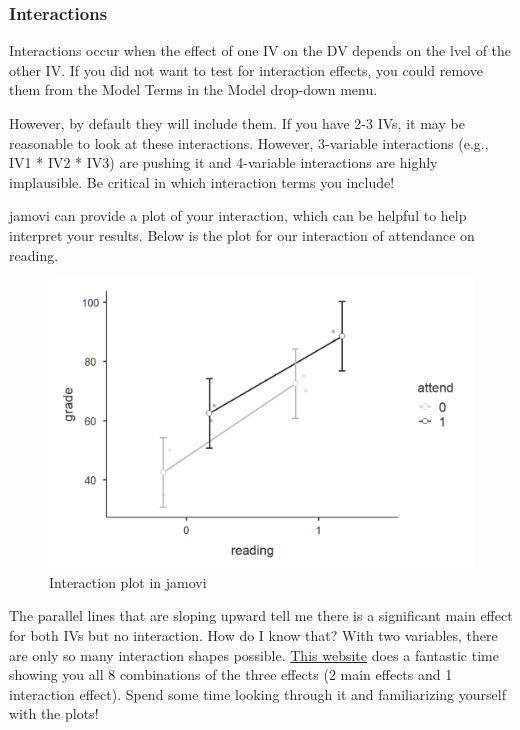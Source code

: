 \documentclass[
]{book}
\begin{document}
\hypertarget{interactions}{%
\subsubsection{Interactions}\label{interactions}}

Interactions occur when the effect of one IV on the DV depends on the lvel of the other IV. If you did not want to test for interaction effects, you could remove them from the Model Terms in the Model drop-down menu.

However, by default they will include them. If you have 2-3 IVs, it may be reasonable to look at these interactions. However, 3-variable interactions (e.g., IV1 * IV2 * IV3) are pushing it and 4-variable interactions are highly implausible. Be critical in which interaction terms you include!

jamovi can provide a plot of your interaction, which can be helpful to help interpret your results. Below is the plot for our interaction of attendance on reading.

\begin{figure}

{\centering \includegraphics[width=1\linewidth]{images/06-factorial-anova/independent-factorial_plot} 

}

\caption{Interaction plot in jamovi}\label{fig:unnamed-chunk-4}
\end{figure}

The parallel lines that are sloping upward tell me there is a significant main effect for both IVs but no interaction. How do I know that? With two variables, there are only so many interaction shapes possible. \href{https://courses.washington.edu/smartpsy/interactions.htm}{This website} does a fantastic time showing you all 8 combinations of the three effects (2 main effects and 1 interaction effect). Spend some time looking through it and familiarizing yourself with the plots!
\end{document}
